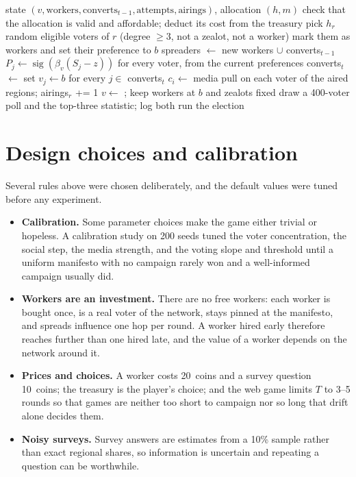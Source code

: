 \documentclass[11pt,a4paper,oneside]{report}
\newcommand{\coins}[1]{#1~coins}
\newcommand{\sig}{\operatorname{sig}}
\begin{document}
\begin{algorithm}[t]
\caption{Resolve campaign round $t$ for a player with manifesto $b$}\label{alg:round}
\begin{algorithmic}[1]
\Require state $(v, \text{workers}, \text{converts}_{t-1}, \text{attempts}, \text{airings})$, allocation
         $(h, m)$
\State check that the allocation is valid and affordable; deduct its cost from the treasury
 
  \State pick $h_r$ random eligible voters of $r$ (degree $\ge 3$, not a zealot, not a worker)
  \State mark them as workers and set their preference to $b$
\EndFor
\State spreaders $\gets$ new workers $\cup$ converts$_{t-1}$ 
\State $P_j \gets \sig(\beta_v(S_j - z))$ for every voter, from the current preferences
\State converts$_t$ $\gets$  
\State set $v_j \gets b$ for every $j \in$ converts$_t$
\State $c_i \gets$ media pull on each voter of the aired regions; airings$_r$ += 1 
\State $v \gets$ ; keep workers at $b$ and zealots fixed
\State draw a 400-voter poll and the top-three statistic; log both
 run the election \EndIf
\end{algorithmic}
\end{algorithm}

\section{Design choices and calibration}

Several rules above were chosen deliberately, and the default values were tuned before any experiment.
\begin{itemize}
  \item \textbf{Calibration.} Some parameter choices make the game either trivial or hopeless. A
        calibration study on 200 seeds tuned the voter concentration, the social step, the media strength,
        and the voting slope and threshold until a uniform manifesto with no campaign rarely won and a
        well-informed campaign usually did.
  \item \textbf{Workers are an investment.} There are no free workers: each worker is bought once, is a real
        voter of the network, stays pinned at the manifesto, and spreads influence one hop per round. A
        worker hired early therefore reaches further than one hired late, and the value of a worker depends
        on the network around it.
  \item \textbf{Prices and choices.} A worker costs \coins{20} and a survey question \coins{10}; the
        treasury is the player's choice; and the web game limits $T$ to 3--5 rounds so that games are neither
        too short to campaign nor so long that drift alone decides them.
  \item \textbf{Noisy surveys.} Survey answers are estimates from a 10\% sample rather than exact regional
        shares, so information is uncertain and repeating a question can be worthwhile.
\end{itemize}
\end{document}
